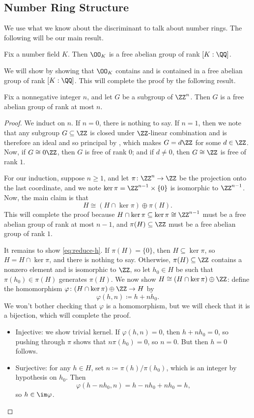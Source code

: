 \documentclass[../notes.tex]{subfiles}
\begin{document}
\subsection{Number Ring Structure}
We use what we know about the discriminant to talk about number rings. The following will be our main result.
\begin{theorem} \label{thm:o-k-is-free}
	Fix a number field $K$. Then $\OO_K$ is a free abelian group of rank $[K:\QQ]$.
\end{theorem}
We will show  by showing that $\OO_K$ contains and is contained in a free abelian group of rank $[K:\QQ]$. This will complete the proof by the following result.
\begin{lemma} \label{lem:subgroup-of-free}
	Fix a nonnegative integer $n$, and let $G$ be a subgroup of $\ZZ^n$. Then $G$ is a free abelian group of rank at most $n$.
\end{lemma}
\begin{proof}
	We induct on $n$. If $n=0$, there is nothing to say. If $n=1$, then we note that any subgroup $G\subseteq\ZZ$ is closed under $\ZZ$-linear combination and is therefore an ideal and so principal by , which makes $G=d\ZZ$ for some $d\in\ZZ$. Now, if $G\cong0\ZZ$, then $G$ is free of rank $0$; and if $d\ne0$, then $G\cong\ZZ$ is free of rank $1$.

	For our induction, suppose $n\ge1$, and let $\pi\colon\ZZ^n\to\ZZ$ be the projection onto the last coordinate, and we note $\ker\pi=\ZZ^{n-1}\times\{0\}$ is isomorphic to $\ZZ^{n-1}$. Now, the main claim is that
	\begin{equation}
		H\cong(H\cap\ker\pi)\oplus\pi(H). \label{eq:reduce-h}
	\end{equation}
	This will complete the proof because $H\cap\ker\pi\subseteq\ker\pi\cong\ZZ^{n-1}$ must be a free abelian group of rank at most $n-1$, and $\pi(H)\subseteq\ZZ$ must be a free abelian group of rank $1$.

	It remains to show \eqref{eq:reduce-h}. If $\pi(H)=\{0\}$, then $H\subseteq\ker\pi$, so $H=H\cap\ker\pi$, and there is nothing to say. Otherwise, $\pi(H)\subseteq\ZZ$ contains a nonzero element and is isomorphic to $\ZZ$, so let $h_0\in H$ be such that $\pi(h_0)\in\pi(H)$ generates $\pi(H)$. We now show $H\cong(H\cap\ker\pi)\oplus\ZZ$: define the homomorphism $\varphi\colon(H\cap\ker\pi)\oplus\ZZ\to H$ by
	\[\varphi(h,n)\coloneqq h+nh_0.\]
	We won't bother checking that $\varphi$ is a homomorphism, but we will check that it is a bijection, which will complete the proof.
	\begin{itemize}
		\item Injective: we show trivial kernel. If $\varphi(h,n)=0$, then $h+nh_0=0$, so pushing through $\pi$ shows that $n\pi(h_0)=0$, so $n=0$. But then $h=0$ follows.
		\item Surjective: for any $h\in H$, set $n\coloneqq\pi(h)/\pi(h_0)$, which is an integer by hypothesis on $h_0$. Then
		\[\varphi(h-nh_0,n)=h-nh_0+nh_0=h,\]
		so $h\in\im\varphi$.
		\qedhere
	\end{itemize}
\end{proof}
\end{document}
